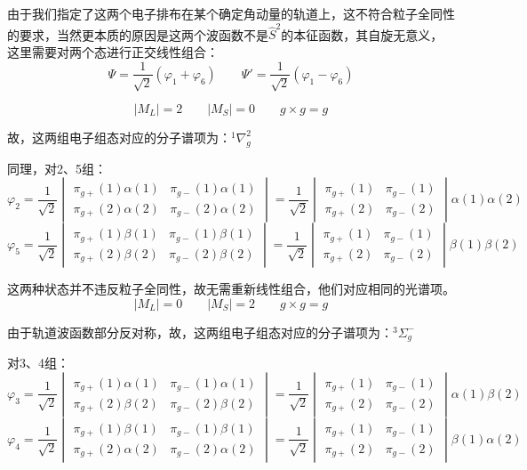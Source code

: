 由于我们指定了这两个电子排布在某个确定角动量的轨道上，这不符合粒子全同性的要求，当然更本质的原因是这两个波函数不是$\hat{S}^2$的本征函数，其自旋无意义，这里需要对两个态进行正交线性组合：
\[\Psi=\frac{1}{\sqrt{2}}(\varphi_1+\varphi_6) \qquad \Psi'=\frac{1}{\sqrt{2}}(\varphi_1-\varphi_6)\]

\[|M_L|=2 \qquad |M_S|=0 \qquad g \times g=g\]

故，这两组电子组态对应的分子谱项为：$^1\nabla^2_g$

同理，对2、5组：
\[
\varphi_2=\frac{1}{\sqrt{2}}
\begin{vmatrix}
    \pi_{g+}(1)\alpha(1) & \pi_{g-}(1)\alpha(1) \\
    \pi_{g+}(2)\alpha(2) & \pi_{g-}(2)\alpha(2)
\end{vmatrix}
=\frac{1}{\sqrt{2}}
\begin{vmatrix}
    \pi_{g+}(1) & \pi_{g-}(1) \\
    \pi_{g+}(2) & \pi_{g-}(2)
\end{vmatrix}
\alpha(1)\alpha(2)
\]
\[
\varphi_5=\frac{1}{\sqrt{2}}
\begin{vmatrix}
    \pi_{g+}(1)\beta(1) & \pi_{g-}(1)\beta(1) \\
    \pi_{g+}(2)\beta(2) & \pi_{g-}(2)\beta(2)
\end{vmatrix}
=\frac{1}{\sqrt{2}}
\begin{vmatrix}
    \pi_{g+}(1) & \pi_{g-}(1) \\
    \pi_{g+}(2) & \pi_{g-}(2)
\end{vmatrix}
\beta(1)\beta(2)
\]

这两种状态并不违反粒子全同性，故无需重新线性组合，他们对应相同的光谱项。
\[|M_L|=0 \qquad |M_S|=2 \qquad g \times g=g\]

由于轨道波函数部分反对称，故，这两组电子组态对应的分子谱项为：$^3\Sigma_g^-$

对3、4组：
\[
\varphi_3=\frac{1}{\sqrt{2}}
\begin{vmatrix}
    \pi_{g+}(1)\alpha(1) & \pi_{g-}(1)\alpha(1) \\
    \pi_{g+}(2)\beta(2) & \pi_{g-}(2)\beta(2)
\end{vmatrix}
=\frac{1}{\sqrt{2}}
\begin{vmatrix}
    \pi_{g+}(1) & \pi_{g-}(1) \\
    \pi_{g+}(2) & \pi_{g-}(2)
\end{vmatrix}
\alpha(1)\beta(2)
\]
\[
\varphi_4=\frac{1}{\sqrt{2}}
\begin{vmatrix}
    \pi_{g+}(1)\beta(1) & \pi_{g-}(1)\beta(1) \\
    \pi_{g+}(2)\alpha(2) & \pi_{g-}(2)\alpha(2)
\end{vmatrix}
=\frac{1}{\sqrt{2}}
\begin{vmatrix}
    \pi_{g+}(1) & \pi_{g-}(1) \\
    \pi_{g+}(2) & \pi_{g-}(2)
\end{vmatrix}
\beta(1)\alpha(2)
\]

